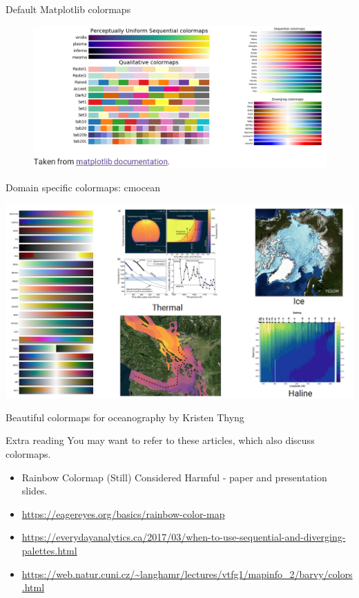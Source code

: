 \documentclass[aspectratio=169]{../latex_main/tntbeamer}  %
\begin{document}
	
	\begin{frame}{Default Matplotlib colormaps}
	    \begin{figure}
	        \centering
	        \includegraphics[scale=.4]{Bild68}
	    \end{figure}
	\end{frame}
	
	
	\begin{frame}{Domain specific colormaps: cmocean}
	
	        \vspace{-1em}
	        \centering
	        \includegraphics[scale=.35]{Bild69}
	        
	         Beautiful colormaps for oceanography by Kristen Thyng
	\end{frame}
	
	
	\begin{frame}{Extra reading}
	    You may want to refer to these articles, which also discuss colormaps.
	    \begin{itemize}
	        \item Rainbow Colormap (Still) Considered Harmful - paper and presentation slides.
	        \item \url{https://eagereyes.org/basics/rainbow-color-map}
	        \item \url{https://everydayanalytics.ca/2017/03/when-to-use-sequential-and-diverging-palettes.html}
	        \item \url{https://web.natur.cuni.cz/~langhamr/lectures/vtfg1/mapinfo_2/barvy/colors.html}
	    \end{itemize}
	\end{frame}
	
\end{document}
